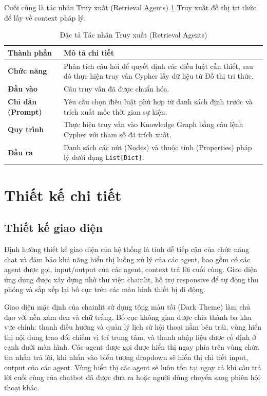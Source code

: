 \documentclass[../DoAn.tex]{subfiles}
\begin{document}
Cuối cùng là tác nhân Truy xuất (Retrieval Agents) \ref{table: retriever_agent}
Truy xuất đồ thị tri thức để lấy về context pháp lý.

\begin{table}[H]
\centering
\begin{tabular}{|l|p{10cm}|}
\hline
\textbf{Thành phần} & \textbf{Mô tả chi tiết} \\ \hline
\textbf{Chức năng} & Phân tích câu hỏi để quyết định các điều luật cần thiết, sau đó thực hiện truy vấn Cypher lấy dữ liệu từ Đồ thị tri thức. \\ \hline
\textbf{Đầu vào} & Câu truy vấn đã được chuẩn hóa. \\ \hline
\textbf{Chỉ dẫn (Prompt)} & Yêu cầu chọn điều luật phù hợp từ danh sách định trước và trích xuất mốc thời gian sự kiện. \\ \hline
\textbf{Quy trình} & Thực hiện truy vấn vào Knowledge Graph bằng câu lệnh Cypher với tham số đã trích xuất. \\ \hline
\textbf{Đầu ra} & Danh sách các nút (Nodes) và thuộc tính (Properties) pháp lý dưới dạng \texttt{List[Dict]}. \\ \hline
\end{tabular}
\caption{Đặc tả Tác nhân Truy xuất (Retrieval Agents)}
\label{table: retriever_agent}
\end{table}

\section{Thiết kế chi tiết}
\subsection{Thiết kế giao diện}
Định hướng thiết kế giao diện của hệ thống là tính dễ tiếp cận của chức năng chat và đảm bảo khả năng hiển thị luồng xử lý của các agent, bao gồm có các agent được gọi, input/output của các agent, context trả lời cuối cùng. Giao diện ứng dụng được xây dựng nhờ thư viện chainlit, hỗ trợ responsive để tự động thu phóng và sắp xếp lại bố cục trên các màn hình thiết bị di động. 

Giao diện mặc định của chainlit sử dụng tông màu tối (Dark Theme) làm chủ đạo với nền xám đen và chữ trắng. Bố cục không gian được chia thành ba khu vực chính: thanh điều hướng và quản lý lịch sử hội thoại nằm bên trái, vùng hiển thị nội dung trao đổi chiếm vị trí trung tâm, và thanh nhập liệu được cố định ở cạnh dưới màn hình. Các agent được gọi được hiển thị ngay phía trên vùng chứa tin nhắn trả lời, khi nhấn vào biểu tượng dropdown sẽ hiển thị chi tiết input, output của các agent. Vùng hiển thị các agent sẽ luôn tồn tại ngay cả khi câu trả lời cuối cùng của chatbot đã được đưa ra hoặc người dùng chuyển sang phiên hội thoại khác.
\end{document}
